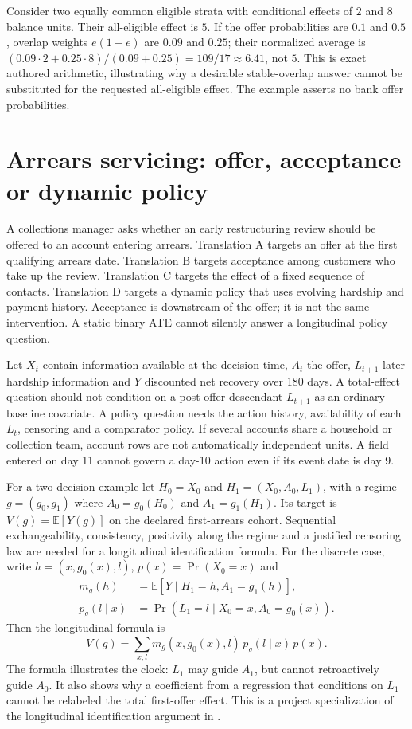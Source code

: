 Consider two equally common eligible strata with conditional effects of $2$ and $8$ balance units. Their all-eligible effect is $5$. If the offer probabilities are $0.1$ and $0.5$, overlap weights $e(1-e)$ are $0.09$ and $0.25$; their normalized average is $(0.09\cdot2+0.25\cdot8)/(0.09+0.25)=109/17\approx6.41$, not $5$. This is exact authored arithmetic, illustrating why a desirable stable-overlap answer cannot be substituted for the requested all-eligible effect. The example asserts no bank offer probabilities.

\section{Arrears servicing: offer, acceptance or dynamic policy}

A collections manager asks whether an early restructuring review should be offered to an account entering arrears. Translation A targets an offer at the first qualifying arrears date. Translation B targets acceptance among customers who take up the review. Translation C targets the effect of a fixed sequence of contacts. Translation D targets a dynamic policy that uses evolving hardship and payment history. Acceptance is downstream of the offer; it is not the same intervention. A static binary ATE cannot silently answer a longitudinal policy question.

Let $X_t$ contain information available at the decision time, $A_t$ the offer, $L_{t+1}$ later hardship information and $Y$ discounted net recovery over 180 days. A total-effect question should not condition on a post-offer descendant $L_{t+1}$ as an ordinary baseline covariate. A policy question needs the action history, availability of each $L_t$, censoring and a comparator policy. If several accounts share a household or collection team, account rows are not automatically independent units. A field entered on day 11 cannot govern a day-10 action even if its event date is day 9.

For a two-decision example let $H_0=X_0$ and $H_1=(X_0,A_0,L_1)$, with a regime $g=(g_0,g_1)$ where $A_0=g_0(H_0)$ and $A_1=g_1(H_1)$. Its target is $V(g)=\mathbb E[Y(g)]$ on the declared first-arrears cohort. Sequential exchangeability, consistency, positivity along the regime and a justified censoring law are needed for a longitudinal identification formula. For the discrete case, write $h=(x,g_0(x),l)$, $p(x)=\Pr(X_0=x)$ and
\begin{align*}
 m_g(h)&=\mathbb E[Y\mid H_1=h,A_1=g_1(h)],\\
 p_g(l\mid x)&=\Pr(L_1=l\mid X_0=x,A_0=g_0(x)).
\end{align*}
Then the longitudinal formula is
\[
 V(g)=\sum_{x,l}m_g(x,g_0(x),l)\,p_g(l\mid x)\,p(x).
\]
The formula illustrates the clock: $L_1$ may guide $A_1$, but cannot retroactively guide $A_0$. It also shows why a coefficient from a regression that conditions on $L_1$ cannot be relabeled the total first-offer effect. This is a project specialization of the longitudinal identification argument in \citet{hernan2020}.

